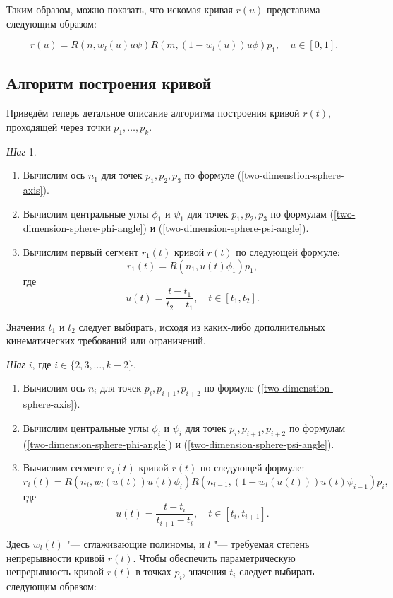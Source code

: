 Таким образом, можно показать, что искомая кривая $r(u)$ представима следующим образом:

$$
r(u)=R(n,w_l(u)u\psi)R(m,(1-w_l(u))u\phi)p_1, \quad u \in [0,1].
$$

\subsection*{Алгоритм построения кривой}

Приведём теперь детальное описание алгоритма построения кривой $r(t)$, проходящей через точки $p_1,\dots,p_k$.

\bigskip
\textit{Шаг} 1.

\begin{enumerate}
\item Вычислим ось $n_1$ для точек $p_1, p_2, p_3$ по формуле (\ref{two-dimenstion-sphere-axis}).
\item Вычислим центральные углы $\phi_1$ и $\psi_1$ для точек $p_1, p_2, p_3$ по формулам
(\ref{two-dimension-sphere-phi-angle}) и (\ref{two-dimension-sphere-psi-angle}).
\item Вычислим первый сегмент $r_1(t)$ кривой $r(t)$ по следующей формуле:
$$
r_1(t)=R(n_1,u(t)\phi_1)p_1,
$$
\noindent где
$$
u(t)=\frac{t-t_1}{t_2-t_1}, \quad t \in [t_1,t_2].
$$
\end{enumerate}

Значения $t_1$ и $t_2$ следует выбирать, исходя из каких-либо дополнительных кинематических требований или ограничений.

\bigskip
\textit{Шаг} $i$, где $i \in \{2,3,\dots,k-2\}$.

\begin{enumerate}
\item Вычислим ось $n_i$ для точек $p_i, p_{i+1}, p_{i+2}$ по формуле (\ref{two-dimenstion-sphere-axis}).
\item Вычислим центральные углы $\phi_i$ и $\psi_i$ для точек $p_i, p_{i+1}, p_{i+2}$ по формулам
(\ref{two-dimension-sphere-phi-angle}) и (\ref{two-dimension-sphere-psi-angle}).
\item Вычислим сегмент $r_i(t)$ кривой $r(t)$ по следующей формуле:
$$
r_i(t)=R(n_i,w_l(u(t))u(t)\phi_i)R(n_{i-1},(1-w_l(u(t)))u(t)\psi_{i-1})p_i,
$$
\noindent где
$$
u(t)=\frac{t-t_i}{t_{i+1}-t_i}, \quad t \in [t_i,t_{i+1}].
$$
\end{enumerate}

Здесь $w_l(t)$ "--- сглаживающие полиномы, и $l$ "--- требуемая степень непрерывности кривой $r(t)$. Чтобы обеспечить
параметрическую непрерывность кривой $r(t)$ в точках $p_i$, значения $t_i$ следует выбирать следующим образом:

